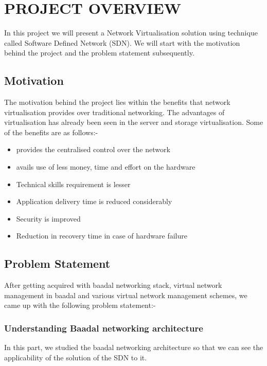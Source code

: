 \chapter{PROJECT OVERVIEW}




In this project we will present a Network Virtualisation solution using technique called Software Defined Network (SDN). We will start with the motivation behind the project and the problem statement subsequently.



\section{Motivation}

The motivation behind the project lies within the benefits that network virtualisation provides over traditional networking. The advantages of virtualisation has already been seen in the server and storage virtualisation. Some of the benefits are as follows:-

\begin{itemize}
    \item provides the centralised control over the network
    \item avails use of less money, time and effort on the hardware
    \item Technical skills requirement is lesser
    \item Application delivery time is reduced considerably
    \item Security is improved
    \item Reduction in recovery time in case of hardware failure
\end{itemize}

\section{Problem Statement}

After getting acquired with baadal networking stack, virtual network management in baadal and various virtual network management schemes, we came up with the following problem statement:-
\subsection{Understanding Baadal networking architecture}
In this part, we studied the baadal networking architecture so that we can see the applicability of the solution of the SDN to it.

